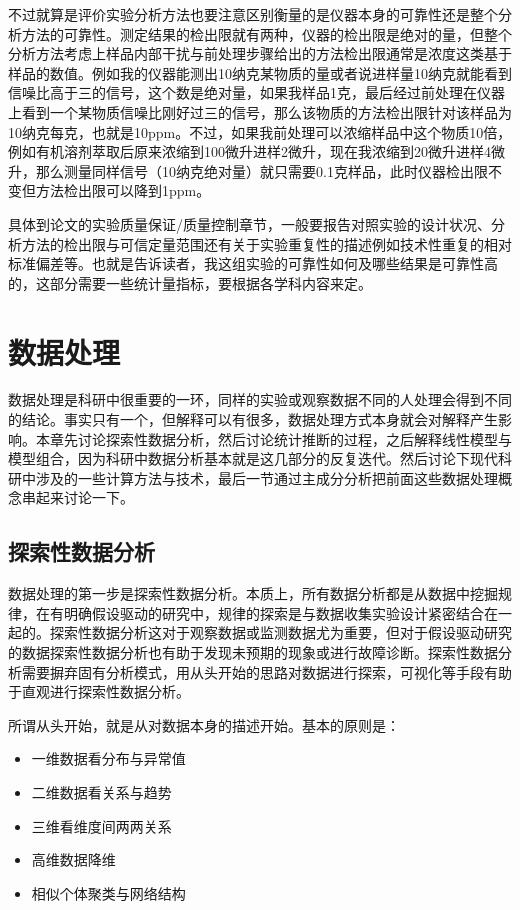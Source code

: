 \documentclass[]{tufte-book}
\providecommand{\tightlist}{%
  \setlength{\itemsep}{0pt}\setlength{\parskip}{0pt}}
\begin{document}
不过就算是评价实验分析方法也要注意区别衡量的是仪器本身的可靠性还是整个分析方法的可靠性。测定结果的检出限就有两种，仪器的检出限是绝对的量，但整个分析方法考虑上样品内部干扰与前处理步骤给出的方法检出限通常是浓度这类基于样品的数值。例如我的仪器能测出10纳克某物质的量或者说进样量10纳克就能看到信噪比高于三的信号，这个数是绝对量，如果我样品1克，最后经过前处理在仪器上看到一个某物质信噪比刚好过三的信号，那么该物质的方法检出限针对该样品为10纳克每克，也就是10ppm。不过，如果我前处理可以浓缩样品中这个物质10倍，例如有机溶剂萃取后原来浓缩到100微升进样2微升，现在我浓缩到20微升进样4微升，那么测量同样信号（10纳克绝对量）就只需要0.1克样品，此时仪器检出限不变但方法检出限可以降到1ppm。

具体到论文的实验质量保证/质量控制章节，一般要报告对照实验的设计状况、分析方法的检出限与可信定量范围还有关于实验重复性的描述例如技术性重复的相对标准偏差等。也就是告诉读者，我这组实验的可靠性如何及哪些结果是可靠性高的，这部分需要一些统计量指标，要根据各学科内容来定。

\hypertarget{data}{%
\chapter{数据处理}\label{data}}

数据处理是科研中很重要的一环，同样的实验或观察数据不同的人处理会得到不同的结论。事实只有一个，但解释可以有很多，数据处理方式本身就会对解释产生影响。本章先讨论探索性数据分析，然后讨论统计推断的过程，之后解释线性模型与模型组合，因为科研中数据分析基本就是这几部分的反复迭代。然后讨论下现代科研中涉及的一些计算方法与技术，最后一节通过主成分分析把前面这些数据处理概念串起来讨论一下。

\hypertarget{ux63a2ux7d22ux6027ux6570ux636eux5206ux6790}{%
\section{探索性数据分析}\label{ux63a2ux7d22ux6027ux6570ux636eux5206ux6790}}

数据处理的第一步是探索性数据分析。本质上，所有数据分析都是从数据中挖掘规律，在有明确假设驱动的研究中，规律的探索是与数据收集实验设计紧密结合在一起的。探索性数据分析这对于观察数据或监测数据尤为重要，但对于假设驱动研究的数据探索性数据分析也有助于发现未预期的现象或进行故障诊断。探索性数据分析需要摒弃固有分析模式，用从头开始的思路对数据进行探索，可视化等手段有助于直观进行探索性数据分析。

所谓从头开始，就是从对数据本身的描述开始。基本的原则是：

\begin{itemize}
\tightlist
\item
  一维数据看分布与异常值
\item
  二维数据看关系与趋势
\item
  三维看维度间两两关系
\item
  高维数据降维
\item
  相似个体聚类与网络结构
\end{itemize}
\end{document}
